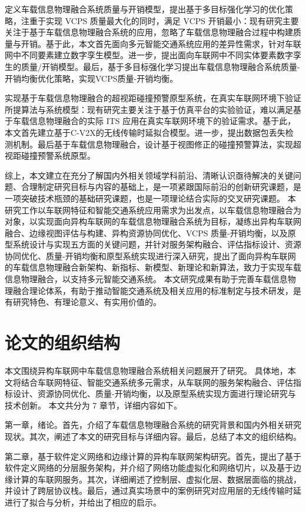  定义车载信息物理融合系统质量与开销模型，提出基于多目标强化学习的优化策略，注重于实现 VCPS 质量最大化的同时，满足 VCPS 开销最小：现有研究主要关注于基于车载信息物理融合系统的应用，忽略了车载信息物理融合过程中构建质量与开销。基于此，本文首先面向多元智能交通系统应用的差异性需求，针对车联网中不同要素建立数字孪生模型。进一步，提出面向车联网中不同实体要素数字孪生的质量/开销模型。最后，基于多目标强化学习提出车载信息物理融合系统质量-开销均衡优化策略，实现VCPS质量-开销均衡。

 实现基于车载信息物理融合的超视距碰撞预警原型系统，在真实车联网环境下验证所提算法与系统模型：现有研究主要关注于基于仿真平台的实验验证，难以满足基于车载信息物理融合的实际 ITS 应用在真实车联网环境下的验证需求。基于此，本文首先建立基于C-V2X的无线传输时延拟合模型。进一步，提出数据包丢失检测机制。最后基于车载信息物理融合，设计基于视图修正的碰撞预警算法，实现超视距碰撞预警系统原型。

综上，本文建立在充分了解国内外相关领域学科前沿、清晰认识亟待解决的关键问题、合理制定研究目标与内容的基础上，是一项紧跟国际前沿的创新研究课题，是一项突破技术瓶颈的基础研究课题，也是一项理论结合实际的交叉研究课题。
本研究工作以车联网特征和智能交通系统应用需求为出发点，以车载信息物理融合为对象，以实现面向异构车联网的车载信息物理融合系统为目标，凝练出异构车联网融合、边缘视图评估与构建、异构资源协同优化、VCPS 质量-开销均衡，以及原型系统设计与实现五方面的关键问题，并针对服务架构融合、评估指标设计、资源协同优化、质量-开销均衡和原型系统实现进行深入研究，提出了面向异构车联网的车载信息物理融合新架构、新指标、新模型、新理论和新算法，致力于实现车载信息物理融合，以支持多元智能交通系统。
本文研究成果有助于完善车载信息物理融合理论体系，有助于推动智能交通系统及相关应用的标准制定与技术研发，是有研究特色、有理论意义、有实用价值的。

\section{论文的组织结构}\label{section 1-7}
本文围绕异构车联网中车载信息物理融合系统相关问题展开了研究。
具体地，本文将结合车联网特征、智能交通系统多元需求，从车联网的服务架构融合、评估指标设计、资源协同优化、质量-开销均衡，以及原型系统实现方面进行理论研究与技术创新。
本文共分为 7 章节，详细内容如下。

第一章，绪论。首先，介绍了车载信息物理融合系统的研究背景和国内外相关研究现状。其次，阐述了本文的研究目标与详细内容。最后，总结了本文的组织结构。

第二章，基于软件定义网络和边缘计算的异构车联网架构研究。首先，提出了基于软件定义网络的分层服务架构，并介绍了网络功能虚拟化和网络切片，以及基于边缘计算的车联网服务。其次，详细阐述了控制层、虚拟化层、数据层面临的挑战，并设计了跨层协议栈。最后，通过真实场景中的案例研究对应用层的无线传输时延进行了拟合与分析，并给出了相应的启示。

